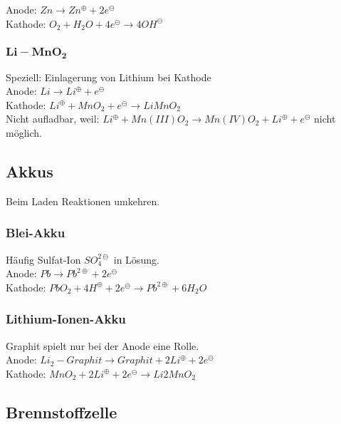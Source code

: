 Anode: $Zn \rightarrow Zn^\oplus + 2e^\ominus$\\

Kathode: $O_2 + H_2O + 4e^\ominus \rightarrow 4OH^\ominus$


\subsubsection{$\boldsymbol{Li-MnO_2}$}

Speziell: Einlagerung von Lithium bei Kathode\\

Anode: $Li \rightarrow Li^\oplus + e^\ominus$\\

Kathode: $Li^\oplus + MnO_2 + e^\ominus \rightarrow LiMnO_2$\\

Nicht aufladbar, weil: $Li^\oplus + Mn(III)O_2 \rightarrow Mn(IV)O_2 + Li^\oplus + e^\ominus$ nicht möglich.

\subsection{Akkus}

Beim Laden Reaktionen umkehren.

\subsubsection{Blei-Akku}

Häufig Sulfat-Ion $SO_4^{2\ominus}$ in Lösung.\\

Anode: $Pb \rightarrow Pb^{2\oplus}+2e^\ominus$\\

Kathode: $PbO_2 + 4 H^\oplus + 2e^\ominus \rightarrow Pb^{2\oplus} + 6H_2O$

\subsubsection{Lithium-Ionen-Akku}

Graphit spielt nur bei der Anode eine Rolle.\\

Anode: $Li_2-Graphit \rightarrow  Graphit + 2Li^\oplus + 2e^\ominus$\\

Kathode: $MnO_2+2Li^\oplus + 2e^\ominus \rightarrow Li2MnO_2$

\subsection{Brennstoffzelle}

